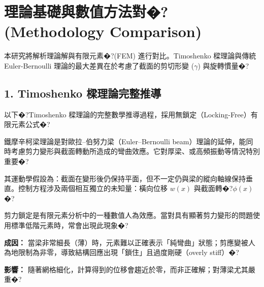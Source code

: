 \documentclass[UTF8, a4paper, 12pt]{ctexart}
\begin{document}
\section{理論基礎與數值方法對�?(Methodology Comparison)}



本研究將解析理論解與有限元素�?(FEM) 進行對比。Timoshenko 樑理論與傳統 Euler-Bernoulli 理論的最大差異在於考慮了截面的剪切形變 ($\gamma$) 與旋轉慣量�?



\subsection{1. Timoshenko 樑理論完整推導}



以下�?Timoshenko 樑理論的完整數學推導過程，採用無鎖定（Locking-Free）有限元素公式�?






鐵摩辛柯梁理論是對歐拉–伯努力梁（Euler–Bernoulli beam）理論的延伸，能同時考慮剪力變形與截面轉動所造成的彎曲效應。它對厚梁、或高頻振動等情況特別重要�?



其運動學假設為：截面在變形後仍保持平面，但不一定仍與梁的縱向軸線保持垂直。控制方程涉及兩個相互獨立的未知量：橫向位移 $w(x)$ 與截面轉�?$\phi(x)$�?






剪力鎖定是有限元素分析中的一種數值人為效應。當對具有顯著剪力變形的問題使用標準低階元素時，常會出現此現象�?



\textbf{成因：} 當梁非常細長（薄）時，元素難以正確表示「純彎曲」狀態；剪應變被人為地限制為非零，導致結構回應出現「鎖住」且過度剛硬（overly stiff）�?



\textbf{影響：} 隨著網格細化，計算得到的位移會趨近於零，而非正確解；對薄梁尤其嚴重�?
\end{document}
